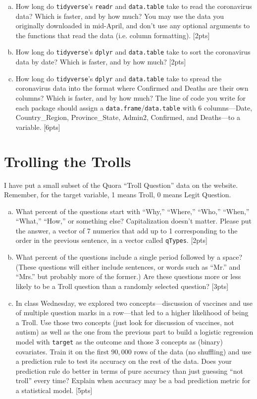 \documentclass[12pt]{article}
\begin{document}
\begin{enumerate}[(a)]
	\item How long do \verb|tidyverse|'s \verb|readr| and \verb|data.table| take to read the coronavirus data? Which is faster, and by how much? You may use the data you originally downloaded in mid-April, and don't use any optional arguments to the functions that read the data (i.e. column formatting). [2pts]
	\item How long do \verb|tidyverse|'s \verb|dplyr| and \verb|data.table| take to sort the coronavirus data by date? Which is faster, and by how much? [2pts]
	\item How long do \verb|tidyverse|'s \verb|dplyr| and \verb|data.table| take to spread the coronavirus data into the format where Confirmed and Deaths are their own columns? Which is faster, and by how much? The line of code you write for each package should assign a \verb|data.frame|/\verb|data.table| with 6 columns---Date, Country\_Region, Province\_State, Admin2, Confirmed, and Deaths---to a variable. [6pts]
\end{enumerate}

\section{Trolling the Trolls}

I have put a small subset of the Quora ``Troll Question'' data on the website. Remember, for the target variable, 1 means Troll, 0 means Legit Question.

\begin{enumerate}[(a)]
	\item What percent of the questions start with ``Why,'' ``Where,'' ``Who,'' ``When,'' ``What,'' ``How,'' or something else? Capitalization doesn't matter. Please put the answer, a vector of 7 numerics that add up to 1 corresponding to the order in the previous sentence, in a vector called \verb|qTypes|. [2pts]
	\item What percent of the questions include a single period followed by a space? (These questions will either include sentences, or words such as ``Mr.'' and ``Mrs.'' but probably more of the former.) Are these questions more or less likely to be a Troll question than a randomly selected question? [3pts]
	\item In class Wednesday, we explored two concepts---discussion of vaccines and use of multiple question marks in a row---that led to a higher likelihood of being a Troll. Use those two concepts (just look for discussion of vaccines, not autism) as well as the one from the previous part to build a logistic regression model with \verb|target| as the outcome and those 3 concepts as (binary) covariates. Train it on the first $90,000$ rows of the data (no shuffling) and use a prediction rule to test its accuracy on the rest of the data. Does your prediction rule do better in terms of pure accuracy than just guessing ``not troll'' every time? Explain when accuracy may be a bad prediction metric for a statistical model. [5pts]
\end{enumerate}
\end{document}
